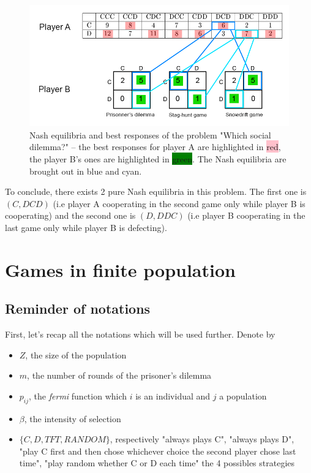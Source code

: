 \documentclass{article}
\begin{document}
\begin{figure}[h]
  \centering
  \includegraphics[scale=0.35]{figures/BR-Bayesian.png}
  \caption{Nash equilibria and best responses of the problem "Which social dilemma?" -- 
  the best responses for player A are highlighted in \colorbox{pink}{red}, the player B's ones are highlighted in \colorbox{green}{green}. The Nash equilibria are brought out in blue and cyan. }
  \label{fig:BR-Bayesian}
\end{figure}

To conclude, there exists 2 pure Nash equilibria in this problem. The first one is $(C, DCD)$ (i.e player A cooperating in the second game only while player B is cooperating) and the second one is $(D, DDC)$ (i.e player B cooperating in the last game only while player B is defecting). 

\section{Games in finite population}

\subsection*{Reminder of notations}
First, let's recap all the notations which will be used further. Denote by 
\begin{itemize}
\item $Z$, the size of the population
\item $m$, the number of rounds of the prisoner's dilemma 
\item $p_{ij}$, the \textit{fermi} function which $i$ is an individual and $j$ a population
\item $\beta$, the intensity of selection
\item $\{C,D,TFT,RANDOM\}$, respectively "always plays C", "always plays D", "play C first and then chose whichever choice the second player chose last time", "play random whether C or D each time" the 4 possibles strategies
\end{itemize}
\end{document}
